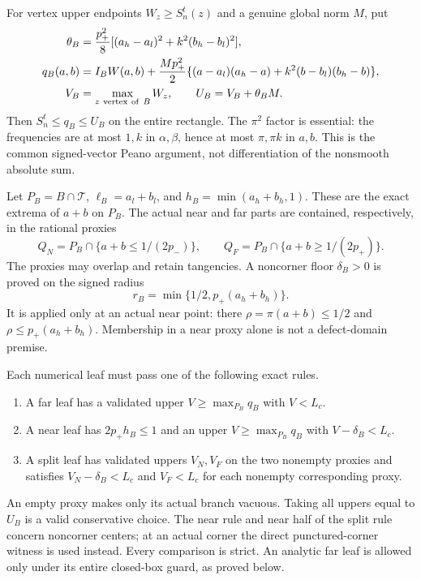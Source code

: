 For vertex upper endpoints $W_z\geq S_n^t(z)$ and a genuine global
norm $M$, put
\begin{align}
 \theta_B&=\frac{p_+^2}{8}
                   [(a_h-a_l)^2+k^2(b_h-b_l)^2],\nonumber\\
 q_B(a,b)&=I_BW(a,b)+\frac{Mp_+^2}{2}
  \{(a-a_l)(a_h-a)+k^2(b-b_l)(b_h-b)\},\nonumber\\
 V_B&=\max_{z\ {\rm vertex\ of}\ B}W_z,\qquad U_B=V_B+\theta_BM.
                                                        \label{eq:argmax-certificate-peano}
\end{align}
Then $S_n^t\leq q_B\leq U_B$ on the entire rectangle.  The
$\pi^2$ factor is essential: the frequencies are at most $1,k$ in
$\alpha,\beta$, hence at most $\pi,\pi k$ in $a,b$.
This is the common signed-vector Peano argument, not differentiation
of the nonsmooth absolute sum.

Let $P_B=B\cap\mathcal T$, $\ell_B=a_l+b_l$, and
$h_B=\min(a_h+b_h,1)$.  These are the exact extrema of $a+b$ on
$P_B$.  The actual near and far parts are contained, respectively, in
the rational proxies
\[
 Q_N=P_B\cap\{a+b\leq1/(2p_-)\},\qquad
 Q_F=P_B\cap\{a+b\geq1/(2p_+)\}.
\]
The proxies may overlap and retain tangencies.  A noncorner floor
$\delta_B>0$ is proved on the signed radius
\[
 r_B=\min\{1/2,p_+(a_h+b_h)\}.
\]
It is applied only at an actual near point: there
$\rho=\pi(a+b)\leq1/2$ and $\rho\leq p_+(a_h+b_h)$.
Membership in a near proxy alone is not a defect-domain premise.

Each numerical leaf must pass one of the following exact rules.
\begin{enumerate}
 \item A far leaf has a validated upper $V\geq\max_{P_B}q_B$ with
 $V<L_c$.
 \item A near leaf has $2p_+h_B\leq1$ and an upper
 $V\geq\max_{P_B}q_B$ with $V-\delta_B<L_c$.
 \item A split leaf has validated uppers $V_N,V_F$ on the two
 nonempty proxies and satisfies $V_N-\delta_B<L_c$ and $V_F<L_c$
 for each nonempty corresponding proxy.
\end{enumerate}
An empty proxy makes only its actual branch vacuous.  Taking all
uppers equal to $U_B$ is a valid conservative choice.  The near rule
and near half of the split rule concern noncorner centers; at an
actual corner the direct punctured-corner witness is used instead.
Every comparison is strict.  An analytic far leaf is allowed only
under its entire closed-box guard, as proved below.

